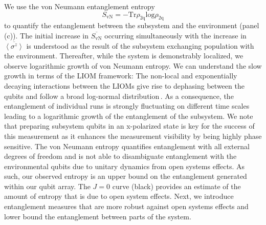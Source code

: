 We use the von Neumann entanglement entropy
\begin{equation}
S_{\text{vN}}=-\text{Tr} \rho_{\text{2q}} \text{log} \rho_{\text{2q}}
\end{equation}
\noindent to quantify the entanglement between the subsystem and the environment (panel\,(c)).
The initial increase in $\overline{ S_{\text{vN}} }$ occurring simultaneously with the increase in $\overline{ \left< \sigma^z \right> }$ is understood as the result of the subsystem exchanging population with the environment.  Thereafter, while the system is demonstrably localized, we observe logarithmic growth of von Neumann entropy. We can understand the slow growth in terms of the LIOM framework: The non-local and exponentially decaying interactions between the LIOMs give rise to dephasing between the qubits and follow a broad log-normal distribution\,\cite{Varma2019}. As a consequence, the entanglement of individual runs is strongly fluctuating on different time scales leading to a logarithmic growth of the entanglement of the subsystem. We note that preparing subsystem qubits in an x-polarized state is key for the success of this measurement as it enhances the measurement visibility by being highly phase sensitive. The von Neumann entropy quantifies entanglement with all external degrees of freedom and is not able to disambiguate entanglement with the environmental qubits due to unitary dynamics from open systems effects.  As such, our observed entropy is an upper bound on the entanglement generated within our qubit array.  The $J=0$ curve (black) provides an estimate of the amount of entropy that is due to open system effects.  Next, we introduce entanglement measures that are more robust against open systems effects and lower bound the entanglement between parts of the system.

\section{} %

\vspace{-14mm}


